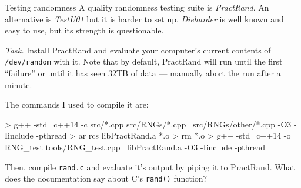 \documentclass{practice}
\begin{document}
\begin{task}{Testing randomness}
  A quality randomness testing suite is \emph{PractRand}\footnotemark{}.
  An alternative is \emph{TestU01}\footnotemark{} but it is harder to set up.
  \emph{Dieharder}\footnotemark{} is well known and easy to use, but its strength is questionable.

  \textit{Task.}
  Install PractRand and evaluate your computer's current contents of \texttt{/dev/random} with it.
  Note that by default, PractRand will run until the first \enquote{failure} or until it has seen 32TB of data --- manually abort the run after a minute.


  The commands I used to compile it are:
  \begin{commandshell}
> g++ -std=c++14 -c src/*.cpp src/RNGs/*.cpp \
    src/RNGs/other/*.cpp -O3 -Iinclude -pthread
> ar rcs libPractRand.a *.o
> rm *.o
> g++ -std=c++14 -o RNG_test tools/RNG_test.cpp \
    libPractRand.a -O3 -Iinclude -pthread
  \end{commandshell}

  Then, compile \texttt{rand.c} and evaluate it's output by piping it to PractRand.
  What does the documentation say about C's \texttt{rand()} function?
\end{task}
\end{document}
